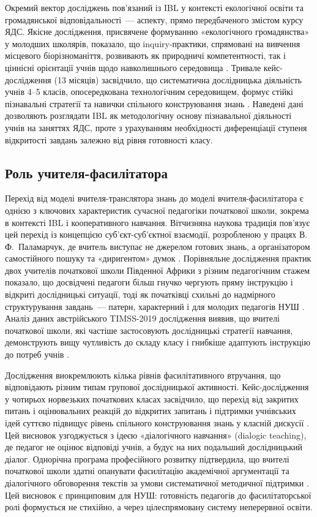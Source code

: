 \documentclass[a4paper,14pt]{extarticle}
\begin{document}
Окремий вектор досліджень пов'язаний із IBL у контексті екологічної освіти та громадянської відповідальності~--- аспекту, прямо передбаченого змістом курсу ЯДС. Якісне дослідження, присвячене формуванню «екологічного громадянства» у молодших школярів, показало, що inquiry-практики, спрямовані на вивчення місцевого біорізноманіття, розвивають як природничі компетентності, так і ціннісні орієнтації учнів щодо навколишнього середовища \parencite{Christodoulou2025969}. Тривале кейс-дослідження (13 місяців) засвідчило, що систематична дослідницька діяльність учнів 4--5 класів, опосередкована технологічним середовищем, формує стійкі пізнавальні стратегії та навички спільного конструювання знань \parencite{Viilo2018407}. Наведені дані дозволяють розглядати IBL як методологічну основу пізнавальної діяльності учнів на заняттях ЯДС, проте з урахуванням необхідності диференціації ступеня відкритості завдань залежно від рівня готовності класу.

\subsection{Роль учителя-фасилітатора}

Перехід від моделі вчителя-транслятора знань до моделі вчителя-фасилітатора є однією з ключових характеристик сучасної педагогіки початкової школи, зокрема в контексті IBL і кооперативного навчання. Вітчизняна наукова традиція пов'язує цей перехід із концепцією суб'єкт-суб'єктної взаємодії, розробленою у працях В.\,Ф.~Паламарчук, де вчитель виступає не джерелом готових знань, а організатором самостійного пошуку та «диригентом» думок \parencite{Palamarchuk2000}. Порівняльне дослідження практик двох учителів початкової школи Південної Африки з різним педагогічним стажем показало, що досвідчені педагоги більш гнучко чергують пряму інструкцію і відкриті дослідницькі ситуації, тоді як початківці схильні до надмірного структурування завдань~--- патерн, характерний і для молодих педагогів НУШ \parencite{Photo20251493}. Аналіз даних австрійського TIMSS-2019 дослідження виявив, що вчителі початкової школи, які частіше застосовують дослідницькі стратегії навчання, демонструють вищу чутливість до складу класу і гнибкіше адаптують інструкцію до потреб учнів \parencite{Neubauer-Hametner2025}.

Дослідження виокремлюють кілька рівнів фасилітативного втручання, що відповідають різним типам групової дослідницької активності. Кейс-дослідження у чотирьох норвезьких початкових класах засвідчило, що перехід від закритих питань і оцінювальних реакцій до відкритих запитань і підтримки учнівських ідей суттєво підвищує рівень спільного конструювання знань у класній дискусії \parencite{Hogsnes20241}. Цей висновок узгоджується з ідеєю «діалогічного навчання» (dialogic teaching), де педагог не оцінює відповіді учнів, а будує на них подальший дослідницький діалог. Однорічна програма професійного розвитку підтвердила, що вчителі початкової школи здатні опанувати фасилітацію академічної аргументації та діалогічного обговорення текстів за умови систематичної методичної підтримки \parencite{Reznitskaya2019254}. Цей висновок є принциповим для НУШ: готовність педагогів до фасилітаторської ролі формується не стихійно, а через цілеспрямовану систему неперервної освіти.
\end{document}
